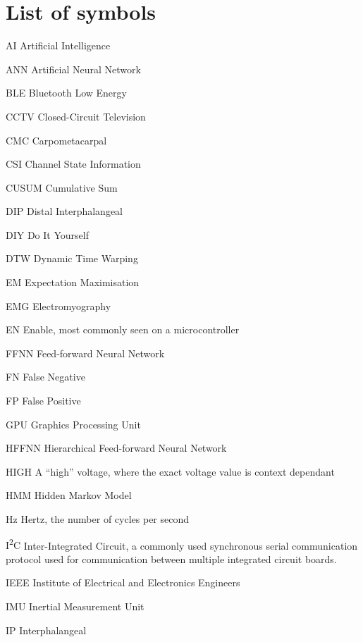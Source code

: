 \chapter{List of symbols}

\begin{Nomencl}[1cm]
    \item[AI] Artificial Intelligence
    \item[ANN] Artificial Neural Network
    \item[BLE] Bluetooth Low Energy
    \item[CCTV] Closed-Circuit Television
    \item[CMC] Carpometacarpal
    \item[CSI] Channel State Information
    \item[CUSUM] Cumulative Sum
    \item[DIP] Distal Interphalangeal
    \item[DIY] Do It Yourself
    \item[DTW] Dynamic Time Warping
    \item[EM] Expectation Maximisation
    \item[EMG] Electromyography
    \item[EN] Enable, most commonly seen on a microcontroller
    \item[FFNN] Feed-forward Neural Network
    \item[FN] False Negative
    \item[FP] False Positive
    \item[GPU] Graphics Processing Unit
    \item[HFFNN] Hierarchical Feed-forward Neural Network
    \item[HIGH] A ``high'' voltage, where the exact voltage value is context dependant
    \item[HMM] Hidden Markov Model
    \item[Hz] \label{nom:hz} Hertz, the number of cycles per second
    \item[I\textsuperscript{2}C] \label{nom:i2c} Inter-Integrated Circuit, a commonly used
        synchronous serial communication protocol used for communication
        between multiple integrated circuit boards.
    \item[IEEE] Institute of Electrical and Electronics Engineers
    \item[IMU] Inertial Measurement Unit
    \item[IP] Interphalangeal

\end{Nomencl}
